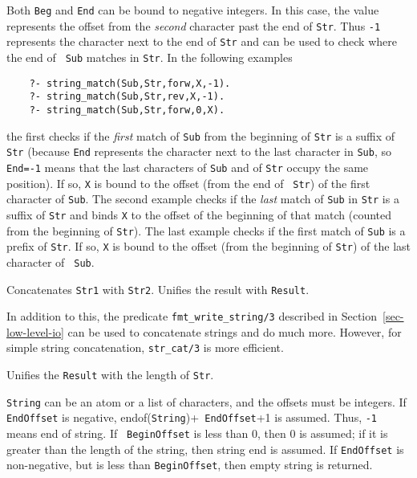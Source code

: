 \begin{description}
Both {\tt Beg} and {\tt End} can be bound to negative integers.
In this case, the value represents the offset from the \emph{second}
character past the end of {\tt Str}. Thus {\tt -1} represents the character
next to the end of {\tt Str} and can be used to check where the end of {\tt
  Sub}  matches in {\tt Str}. In the following examples
\begin{verbatim}
    ?- string_match(Sub,Str,forw,X,-1).  
    ?- string_match(Sub,Str,rev,X,-1).  
    ?- string_match(Sub,Str,forw,0,X).  
\end{verbatim}
the first checks if the \emph{first} match of {\tt Sub} from the beginning
of {\tt Str} is a suffix of {\tt Str} (because {\tt End} represents the
character next to the last character in {\tt Sub}, so {\tt End=-1} means
that the last characters of {\tt Sub} and of {\tt Str} occupy the same
position). If so, {\tt X} is bound to the offset (from the end of {\tt
  Str}) of the first character of {\tt Sub}. The second example checks if
the \emph{last} match of {\tt Sub} in {\tt Str} is a suffix of {\tt Str}
and binds {\tt X} to the offset of the beginning of that match (counted
from the beginning of {\tt Str}).  The last example checks if the first
match of {\tt Sub} is a prefix of {\tt Str}. If so, {\tt X} is bound to the
offset (from the beginning of {\tt Str}) of the last character of {\tt
  Sub}.
 

	
Concatenates {\tt Str1} with {\tt Str2}. Unifies the result with {\tt Result}.

In addition to this, the predicate \verb|fmt_write_string/3| described in
Section~\ref{sec-low-level-io} can be used to concatenate strings and do
much more. However, for simple string concatenation, {\tt str\_cat/3} is
more efficient.


Unifies the {\tt Result}  with the length of {\tt Str}.

{\tt String} can be an atom or a list of characters, and the offsets must
be integers.  If {\tt EndOffset} is negative, endof({\tt String})+{\tt
  EndOffset}+1 is assumed. Thus, {\tt -1} means end of string.  If {\tt
  BeginOffset} is less than 0, then 0 is assumed; if it is greater than the
length of the string, then string end is assumed. If {\tt EndOffset} is
non-negative, but is less than {\tt BeginOffset}, then empty string is
returned.


\end{description}
